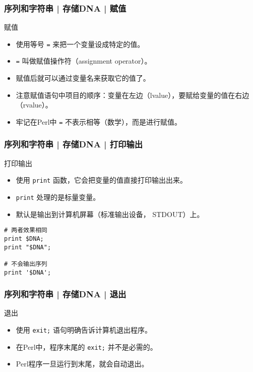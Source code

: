 \begin{frame}[fragile]
  \frametitle{序列和字符串 | 存储DNA | \alert{赋值}}
  \begin{block}{赋值}
    \begin{itemize}
      \item 使用等号 \verb|=| 来把一个变量设成特定的值。
      \item \verb|=| 叫做赋值操作符（assignment operator）。
      \item 赋值后就可以通过变量名来获取它的值了。
      \item 注意赋值语句中项目的顺序：变量在左边（lvalue），要赋给变量的值在右边（rvalue）。
      \item 牢记在Perl中 \verb|=| 不表示相等（数学），而是进行赋值。
    \end{itemize}
  \end{block}
\end{frame}

\begin{frame}[fragile]
  \frametitle{序列和字符串 | 存储DNA | 打印输出}
  \begin{block}{打印输出}
    \begin{itemize}
      \item 使用 \verb|print| 函数，它会把变量的值直接打印输出出来。
      \item \verb|print| 处理的是标量变量。
      \item 默认是输出到计算机屏幕（标准输出设备， STDOUT）上。
    \end{itemize}
  \end{block}
  \pause
\begin{lstlisting}
# 两者效果相同
print $DNA;
print "$DNA";

# 不会输出序列
print '$DNA';
\end{lstlisting}
\end{frame}

\begin{frame}[fragile]
  \frametitle{序列和字符串 | 存储DNA | \alert{退出}}
  \begin{block}{退出}
    \begin{itemize}
      \item 使用 \verb|exit;| 语句明确告诉计算机退出程序。
      \item 在Perl中，程序末尾的 \verb|exit;| 并不是必需的。
      \item Perl程序一旦运行到末尾，就会自动退出。
    \end{itemize}
  \end{block}
\end{frame}

